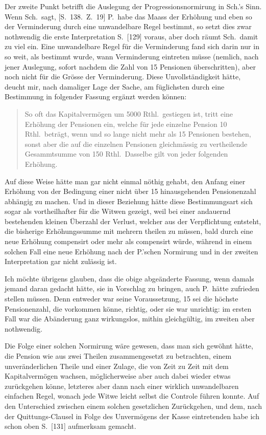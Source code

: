 \documentclass[12pt,a4paper]{article}
\begin{document}
Der zweite Punkt betrifft die Auslegung der Progressionsnormirung in Sch.'s Sinn. Wenn Sch.\ sagt, [S.\ 138.\ Z.\ 19] P.\ habe das Maass der Erh\"ohung und eben so der Verminderung durch eine unwandelbare Regel bestimmt, so setzt dies zwar nothwendig die erste Interpretation S.\ [129] voraus, aber doch r\"aumt Sch.\ damit zu viel ein. Eine unwandelbare Regel f\"ur die Verminderung fand sich darin nur in so weit, als bestimmt wurde, wann Verminderung eintreten m\"usse (nemlich, nach jener Auslegung, sofort nachdem die Zahl von 15 Pensionen \"uberschritten), aber noch nicht f\"ur die Gr\"osse der Verminderung. Diese Unvollst\"andigkeit h\"atte, deucht mir, nach damaliger Lage der Sache, am f\"uglichsten durch eine Bestimmung in folgender Fassung erg\"anzt werden k\"onnen:

\begin{quote}
So oft das Kapitalverm\"ogen um 5000 Rthl.\ gestiegen ist, tritt eine Erh\"ohung der Pensionen ein, welche f\"ur jede einzelne Pension 10 Rthl.\ betr\"agt, wenn und so lange nicht mehr als 15 Pensionen bestehen, sonst aber die auf die einzelnen Pensionen gleichm\"assig zu vertheilende Gesammtsumme von 150 Rthl.\ Dasselbe gilt von jeder folgenden Erh\"ohung.
\end{quote}

Auf diese Weise h\"atte man gar nicht einmal n\"othig gehabt, den Anfang einer Erh\"ohung von der Bedingung einer nicht \"uber 15 hinausgehenden Pensionenzahl abh\"angig zu machen. Und in dieser Beziehung h\"atte diese Bestimmungsart sich sogar als vortheilhafter f\"ur die Witwen gezeigt, weil bei einer andauernd bestehenden kleinen \"Uberzahl der Verlust, welcher aus der Verpflichtung entsteht, die bisherige Erh\"ohungssumme mit mehrern theilen zu m\"ussen, bald durch eine neue Erh\"ohung compensirt oder mehr als compensirt w\"urde, w\"ahrend in einem solchen Fall eine neue Erh\"ohung nach der P.'schen Normirung und in der zweiten Interpretation gar nicht zul\"assig ist.

Ich m\"ochte \"ubrigens glauben, dass die obige abge\"anderte Fassung, wenn damals jemand daran gedacht h\"atte, sie in Vorschlag zu bringen, auch P.\ h\"atte zufrieden stellen m\"ussen. Denn entweder war seine Voraussetzung, 15 sei die h\"ochste Pensionenzahl, die vorkommen k\"onne, richtig, oder sie war unrichtig: im ersten Fall war die Ab\"anderung ganz wirkungslos, mithin gleichg\"ultig, im zweiten aber nothwendig.

Die Folge einer solchen Normirung w\"are gewesen, dass man sich gew\"ohnt h\"atte, die Pension wie aus zwei Theilen zusammengesetzt zu betrachten, einem unver\"anderlichen Theile und einer Zulage, die von Zeit zu Zeit mit dem Kapitalverm\"ogen wachsen, m\"oglicherweise aber auch dabei wieder etwas zur\"uckgehen k\"onne, letzteres aber dann nach einer wirklich unwandelbaren einfachen Regel, wonach jede Witwe leicht selbst die Controle f\"uhren konnte. Auf den Unterschied zwischen einem solchen gesetzlichen Zur\"uckgehen, und dem, nach der Quittungs-Clausel in Folge des Unverm\"ogens der Kasse eintretenden habe ich schon oben S.\ [131] aufmerksam gemacht.
\end{document}
